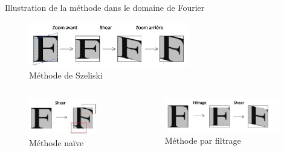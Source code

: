 \documentclass[c,12pt]{beamer}
\begin{document}
\begin{frame}{Illustration de la méthode dans le domaine de Fourier }

\begin{figure}
\centering
\includegraphics[width=7cm]{fourier1.jpg}
\caption{Méthode de Szeliski}
\end{figure}

\begin{columns}
\begin{column}{4cm}

\begin{figure}
\centering
\includegraphics[width=3cm]{fourier2.jpg}
\caption{Méthode naïve}
\end{figure}


\end{column}

\begin{column}{6cm}

\begin{figure}
\centering
\includegraphics[width=5cm]{fourier3.jpg}
\caption{Méthode par filtrage}
\end{figure}


\end{column}
\end{columns}

\end{frame}
\end{document}
